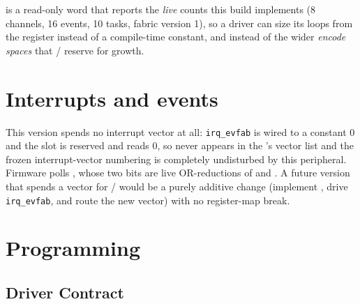  is a read-only word that reports the \textit{live} counts this build implements (8 channels, 16 events, 10 tasks, fabric version 1), so a driver can size its loops from the register instead of a compile-time constant, and instead of the wider \textit{encode spaces} that / reserve for growth.

\section{Interrupts and events}

This version spends no interrupt vector at all: \texttt{irq\_evfab} is wired to a constant 0 and the  slot is reserved and reads 0, so  never appears in the 's vector list and the frozen interrupt-vector numbering is completely undisturbed by this peripheral. Firmware polls , whose two bits are live OR-reductions of  and . A future version that spends a vector for / would be a purely additive change (implement , drive \texttt{irq\_evfab}, and route the new vector) with no register-map break.

\section{Programming}

\subsection{Driver Contract}
\label{s:evfab-contract}

